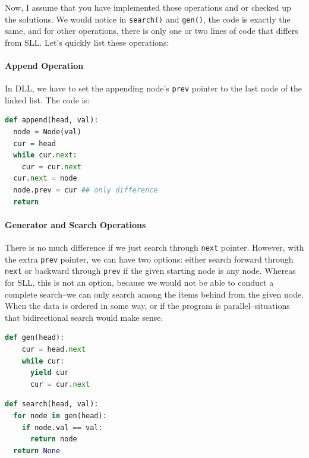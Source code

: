 \documentclass[../main.tex]{subfiles}
\begin{document}
Now, I assume that you have implemented those operations and or checked up the solutions. We would notice in \texttt{search()} and \texttt{gen()}, the code is exactly the same, and for other operations, there is only one or two lines of code that differs from SLL. Let's quickly list these operations: 

\paragraph{Append Operation} In DLL, we have to set the appending node's \texttt{prev} pointer to the last node of the linked list. The code is: 
\begin{lstlisting}[language=Python]
def append(head, val):
  node = Node(val)
  cur = head
  while cur.next:
    cur = cur.next
  cur.next = node
  node.prev = cur ## only difference
  return
\end{lstlisting}

\paragraph{Generator and Search Operations} There is no much difference if we just search through \texttt{next} pointer. However, with the extra \texttt{prev} pointer, we can have two options: either search forward through \texttt{next} or backward through \texttt{prev} if the given starting node is any node. Whereas for SLL, this is not an option, because we would not be able to conduct a complete search--we can only search among the items behind from the given node. When the data is ordered in some way, or if the program is parallel--situations that bidirectional search would make sense.
\begin{lstlisting}[language=Python]
def gen(head):
    cur = head.next
    while cur:
      yield cur
      cur = cur.next
\end{lstlisting}
\begin{lstlisting}[language=Python]
def search(head, val):
  for node in gen(head):
    if node.val == val:
      return node
  return None
\end{lstlisting}
\end{document}
